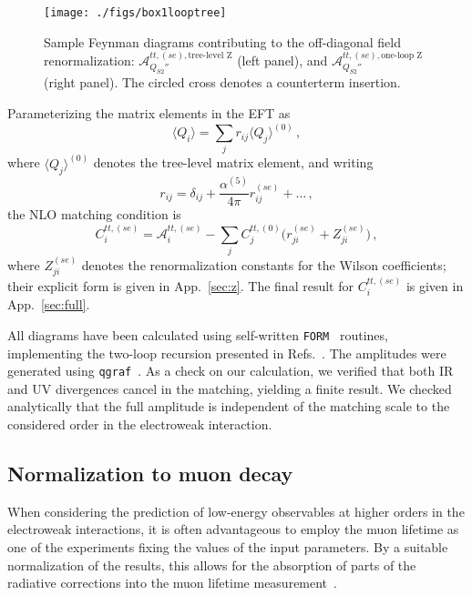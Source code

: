 \documentclass[letter,11pt,DIV=12,abstract=true,numbers=noenddot,titlepage=false,twocolumn=false,draft=false]{scrartcl}
\begin{document}
\begin{figure}[t]
        \centering
        \texttt{[image: ./figs/box1looptree]}
        \caption{Sample Feynman diagrams contributing to the
          off-diagonal field renormalization: ${\mathcal
            A}_{Q_{S2}''}^{tt,(se),\text{tree-level Z}}$ (left panel),
          and ${\mathcal A}_{Q_{S2}''}^{tt,(se),\text{one-loop Z}}$
          (right panel). The circled cross denotes a counterterm
          insertion.
	\label{fig:countt}}
\end{figure}

Parameterizing the matrix elements in the EFT as
\begin{equation}
  \langle Q_i \rangle = \sum_j r_{ij} \langle Q_j \rangle^{(0)} \,,
\end{equation}
where $\langle Q_j \rangle^{(0)}$ denotes the tree-level matrix
element, and writing
\begin{equation}
  r_{ij} = \delta_{ij} + \frac{\alpha^{(5)}}{4\pi} r_{ij}^{(se)} + \ldots \,,
\end{equation}
the NLO matching condition is
\begin{equation}
  C_{i}^{tt,(se)}
= {\mathcal A}_{i}^{tt,(se)}
  - \sum_j C_{j}^{tt,(0)}  \Big( r_{ji}^{(se)} + Z_{ji}^{(se)} \Big) \,,
\end{equation}
where $Z_{ji}^{(se)}$ denotes the renormalization constants for the
Wilson coefficients; their explicit form is given in
App.~\ref{sec:z}. The final result for $C_{i}^{tt,(se)}$ is given in
App.~\ref{sec:full}.

All diagrams have been calculated using self-written
\texttt{FORM}~\cite{Vermaseren:2000nd} routines, implementing the
two-loop recursion presented in Refs.~\cite{Davydychev:1992mt,
  Bobeth:1999mk}. The amplitudes were generated using
\texttt{qgraf}~\cite{Nogueira:1991ex}. As a check on our calculation,
we verified that both IR and UV divergences cancel in the matching,
yielding a finite result. We checked analytically that the full
amplitude is independent of the matching scale to the considered order
in the electroweak interaction.

\subsection{Normalization to muon decay}\label{sec:muon}

When considering the prediction of low-energy observables at higher
orders in the electroweak interactions, it is often advantageous to
employ the muon lifetime as one of the experiments fixing the values
of the input parameters. By a suitable normalization of the results,
this allows for the absorption of parts of the radiative corrections
into the muon lifetime measurement~\cite{Sirlin:1981ie}.
\end{document}
